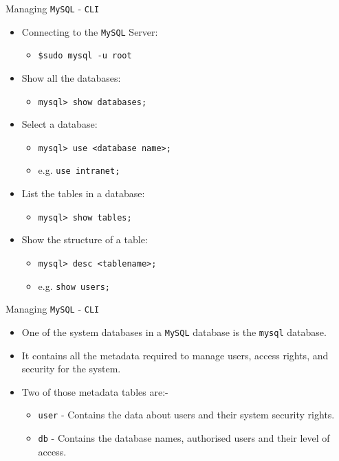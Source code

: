 \documentclass[xcolor=table,aspectratio=169]{beamer}
\begin{document}
\begin{frame}{Managing \texttt{MySQL} - \texttt{CLI}}
  \begin{itemize}
    \item Connecting to the \texttt{MySQL} Server:
      \begin{itemize}
        \item \texttt{\$sudo mysql -u root}    
      \end{itemize}
    \item Show all the databases:
      \begin{itemize}
        \item \texttt{mysql> show databases;}    
      \end{itemize}
    \item Select a database:
      \begin{itemize}
        \item \texttt{mysql> use <database name>;}
        \item e.g. \texttt{use intranet;}    
      \end{itemize}
    \item List the tables in a database:
      \begin{itemize}
        \item \texttt{mysql> show tables;}
      \end{itemize}
    \item Show the structure of a table: 
      \begin{itemize}
        \item \texttt{mysql> desc <tablename>;}
        \item e.g. \texttt{show users;}    
      \end{itemize}
  \end{itemize}
\end{frame}

\begin{frame}{Managing \texttt{MySQL} - \texttt{CLI}}
  \begin{itemize}
    \item One of the system databases in a \texttt{MySQL} database is the \texttt{mysql} database.
    \item It contains all the metadata required to manage users, access rights, and security for the system.
    \item Two of those metadata tables are:-
      \begin{itemize}
        \item \texttt{user} - Contains the data about users and their system security rights.
        \item \texttt{db} - Contains the database names, authorised users and their level of access.
      \end{itemize}
  \end{itemize}
\end{frame}
\end{document}

